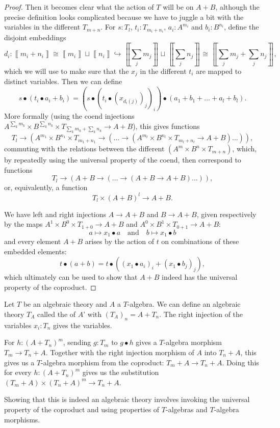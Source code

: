 \begin{proof}
  Then it becomes clear what the action of $ T $ will be on $ A + B $, although the precise definition looks complicated because we have to juggle a bit with the variables in the different $ T_{m + n} $. For $ s : T_l $, $ t_i : T_{m_i + n_i} $, $ a_i : A^{m_i} $ and $ b_i : B^{n_i} $, define the disjoint embeddings
  \[ d_i : \left\llbracket m_i + n_i \right\rrbracket \cong \left\llbracket m_i \right\rrbracket \sqcup \left\llbracket n_i \right\rrbracket \hookrightarrow \left\llbracket \sum_j m_j \right\rrbracket \sqcup \left\llbracket \sum_j n_j \right\rrbracket \cong \left\llbracket \sum_j m_j + \sum_j n_j \right\rrbracket, \]
  which we will use to make sure that the $ x_j $ in the different $ t_i $ are mapped to distinct variables. Then we can define
  \[ s \bullet (t_i \bullet a_i + b_i) = (s \bullet (t_i \bullet (x_{d_i(j)})_j)_i) \bullet (a_1 + b_1 + \dots + a_l + b_l). \]
  More formally (using the coend injections $ A^{\sum_k m_k} \times B^{\sum_k n_k} \times T_{\sum_k m_k + \sum_k n_k} \to A + B $), this gives functions
  \[ T_l \to (A^{m_1} \times B^{n_1} \times T_{m_1 + n_1} \to (\dots \to (A^{m_l} \times B^{n_l} \times T_{m_l + n_l} \to A + B) \dots )), \]
  commuting with the relations between the different $ (A^m \times B^n \times T_{m + n}) $, which, by repeatedly using the universal property of the coend, then correspond to functions
  \[ T_l \to (A + B \to (\dots \to (A + B \to A + B) \dots )), \]
  or, equivalently, a function
  \[ T_l \times (A + B)^l \to A + B. \]

  We have left and right injections $ A \to A + B $ and $ B \to A + B $, given respectively by the maps $ A^1 \times B^0 \times T_{1 + 0} \to A + B $ and $ A^0 \times B^1 \times T_{0 + 1} \to A + B $:
  \[ a \mapsto x_1 \bullet a \quad \text{and} \quad b \mapsto x_1 \bullet b \]
  and every element $ A + B $ arises by the action of $ t $ on combinations of these embedded elements:
  \[ t \bullet (a + b) = t \bullet ((x_1 \bullet a_i)_i + (x_1 \bullet b_j)_j), \]
  which ultimately can be used to show that $ A + B $ indeed has the universal property of the coproduct.
\end{proof}

\begin{definition}
  Let $ T $ be an algebraic theory and $ A $ a $ T $-algebra. We can define an algebraic theory $ T_A $ called the  of $ A $' with $ (T_A)_n = A + T_n $. The right injection of the variables $ x_i : T_n $ gives the variables.

  For $ h: (A + T_n)^m $, sending $ g: T_m $ to $ g \bullet h $ gives a $ T $-algebra morphism $ T_m \to T_n + A $. Together with the right injection morphism of $ A $ into $ T_n + A $, this gives us a $ T $-algebra morphism from the coproduct: $ T_m + A \to T_n + A $. Doing this for every $ h: (A + T_n)^m $ gives us the substitution $ (T_m + A) \times (T_n + A)^m \to T_n + A $.

  Showing that this is indeed an algebraic theory involves invoking the universal property of the coproduct and using properties of $ T $-algebras and $ T $-algebra morphisms.
\end{definition}

